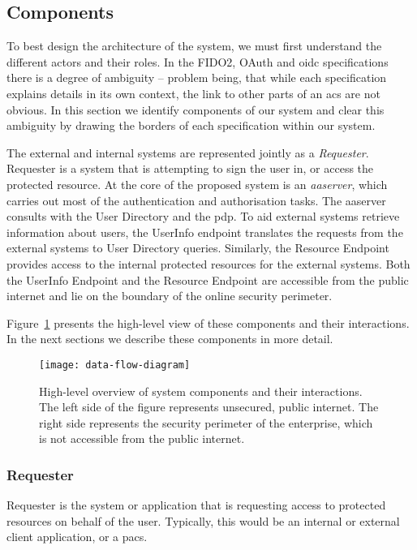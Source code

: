 \subsection{Components}\label{sec:design-components}
To best design the architecture of the system, we must first understand the different actors and their roles. In the FIDO2, OAuth and \acrshort{oidc} specifications there is a degree of ambiguity -- problem being, that while each specification explains details in its own context, the link to other parts of an \acrshort{acs} are not obvious. In this section we identify components of our system and clear this ambiguity by drawing the borders of each specification within our system.

The external and internal systems are represented jointly as a \textit{Requester}. Requester is a system that is attempting to sign the user in, or access the protected resource. At the core of the proposed system is an \textit{\acrfull{aaserver}}, which carries out most of the authentication and authorisation tasks. The \acrshort{aaserver} consults with the User Directory and the  \acrfull{pdp}. To aid external systems retrieve information about users, the UserInfo endpoint translates the requests from the external systems to User Directory queries. Similarly, the Resource Endpoint provides access to the internal protected resources for the external systems. Both the UserInfo Endpoint and the Resource Endpoint are accessible from the public internet and lie on the boundary of the online security perimeter.

Figure~\ref{fig:data-flow-diagram} presents the high-level view of these components and their interactions. In the next sections we describe these components in more detail.

\begin{figure}[ht]
    \centering
    \texttt{[image: data-flow-diagram]}
    \caption{High-level overview of system components and their interactions. The left side of the figure represents unsecured, public internet. The right side represents the security perimeter of the enterprise, which is not accessible from the public internet.}
    \label{fig:data-flow-diagram}
\end{figure}

\subsubsection{Requester} 
Requester is the system or application that is requesting access to protected resources on behalf of the user. Typically, this would be an internal or external client application, or a \acrshort{pacs}.

